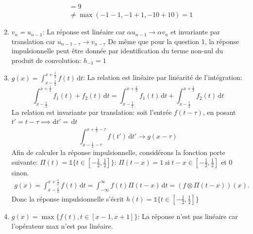 \begin{enumerate}
\begin{equation*}
\begin{split}
			&= 9 \\
			&\neq \max(-1-1, -1+1, -10 + 10) = 1
\end{split}
\end{equation*}
\item $v_n = u_{n-1}$: \newline
La réponse est linéaire car $\alpha u_{n-1} \rightarrow \alpha v_n$ et invariante par translation \newline car $u_{n-1-\tau} \rightarrow v_{n-\tau}$ \newline
De même que pour la question 1, la réponse impulsionnelle peut être donnée par identification du terme non-nul du produit de convolution: $h_{-1} = 1$
\item $g(x) = \int_{x-\frac{1}{2}}^{x+\frac{1}{2}} f(t) \,\mathrm{d}t$: \newline
La relation est linéaire par linéarité de l'intégration: $$\int_{x-\frac{1}{2}}^{x+\frac{1}{2}} f_1(t) + f_2(t) \,\mathrm{d}t = \int_{x-\frac{1}{2}}^{x+\frac{1}{2}} f_1(t) \,\mathrm{d}t+ \int_{x-\frac{1}{2}}^{x+\frac{1}{2}} f_2(t) \,\mathrm{d}t$$ \newline
La relation est invariante par translation: soit l'entrée $f(t-\tau)$, \newline en posant $t' = t -\tau \implies \mathrm{d}t' = \,\mathrm{d}t $ $$\int_{x-\frac{1}{2}-\tau}^{x+\frac{1}{2}-\tau} f(t')\,\mathrm{d}t' \rightarrow g(x-\tau)$$
Afin de calculer la réponse impulsionnelle, considérons la fonction porte suivante: $\Pi(t) = \mathds{1}\{t \in {[{-\frac{1}{2}}, \frac{1}{2}]}\}$:  $\Pi(t-x) = 1 \;\text{si}\; t-x \in {[{-\frac{1}{2}}, \frac{1}{2}]}$ et 0 sinon.\newline
\begin{equation*}\begin{split}
g(x) = \int_{x-\frac{1}{2}}^{x+\frac{1}{2}} f(t) \,\mathrm{d}t = \int_{-\infty}^{\infty} f(t) \Pi(t-x) \,\mathrm{d}t = (f \otimes \Pi(t-x))(x).
\end{split}\end{equation*}
Donc la réponse impulsionnelle s'écrit $h(t) = \mathds{1}\{t\in {[{-\frac{1}{2}}, \frac{1}{2}]}\}$
\item $g(x) = \max\{f(t), t \in {[x-1, x+1]}\}$: \newline
La réponse n'est pas linéaire car l'opérateur max n'est pas linéaire.
\end{enumerate}
